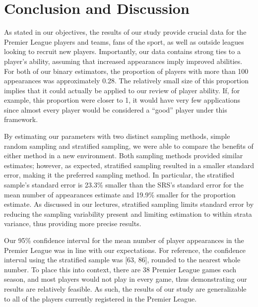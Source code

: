 \documentclass[paper=a4, fontsize=12pt,twoside]{article}	%
\begin{document}
\section{Conclusion and Discussion}
As stated in our objectives, the results of our study provide crucial data for the Premier League players and teams, fans of the sport, as well as outside leagues looking to recruit new players. Importantly, our data contains strong ties to a player’s ability, assuming that increased appearances imply improved abilities. For both of our binary estimators, the proportion of players with more than 100 appearances was approximately 0.28. The relatively small size of this proportion implies that it could actually be applied to our review of player ability. If, for example, this proportion were closer to 1, it would have very few applications since almost every player would be considered a “good” player under this framework.

\vspace{2mm}
\noindent By estimating our parameters with two distinct sampling methods, simple random sampling and stratified sampling, we were able to compare the benefits of either method in a new environment. Both sampling methods provided similar estimates; however, as expected, stratified sampling resulted in a smaller standard error, making it the preferred sampling method. In particular, the stratified sample’s standard error is 23.3\% smaller than the SRS’s standard error for the mean number of appearances estimate and 19.9\% smaller for the proportion estimate. As discussed in our lectures, stratified sampling limits standard error by reducing the sampling variability present and limiting estimation to within strata variance, thus providing more precise results.

\vspace{2mm}
\noindent Our 95\% confidence interval for the mean number of player appearances in the Premier League was in line with our expectations. For reference, the confidence interval using the stratified sample was [63, 86], rounded to the nearest whole number. To place this into context, there are 38 Premier League games each season, and most players would not play in every game, thus demonstrating our results are relatively feasible. As such, the results of our study are generalizable to all of the players currently registered in the Premier League.
\end{document}
